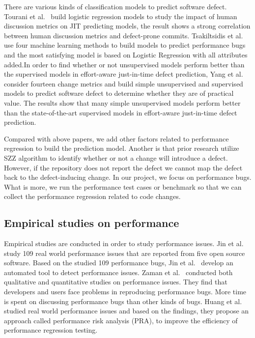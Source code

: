 There are various kinds of classification models to predict software defect. Tourani et al.~\cite{tourani2016impact} build logistic regression models to study the impact of human discussion metrics on JIT predicting models, the result shows a strong correlation between human discussion metrics and defect-prone commits.  Tsakiltsidis et al.~\cite{tsakiltsidis2016automatic} use four machine learning methods to build models to predict performance bugs and the most satisfying model is based on Logistic Regression with all attributes added.In order to find whether or not unsupervised models perform better than the supervised models in effort-aware just-in-time defect prediction, Yang et al.~\cite{Yang:2016:EJD} consider fourteen change metrics and build simple unsupervised and supervised models to predict software defect to determine whether they are of practical value. The results show that many simple unsupervised models perform better than the state-of-the-art supervised models in effort-aware just-in-time defect prediction. 

 Compared with above papers, we add other factors related to performance regression to build the prediction model. Another is that prior research utilize SZZ algorithm to identify whether or not a change will introduce a defect. However, if the repository does not report the defect we cannot map the defect back to the defect-inducing change. In our project, we focus on performance bugs. What is more, we run the performance test cases or benchmark so that we can collect the performance regression related to code changes.

\subsection{Empirical studies on performance}
Empirical studies are conducted in order to study performance issues. Jin et al.~\cite{Jin:2012} study 109 real world performance issues that are reported from five open source software. Based on the studied 109 performance bugs, Jin et al.~\cite{Jin:2012} develop an automated tool to detect performance issues. Zaman et al.~\cite{MSR11:Zaman,MSR12:Zaman} conducted both qualitative and quantitative studies on performance issues. They find that developers and users face problems in reproducing performance bugs. More time is spent on discussing performance bugs than other kinds of bugs. Huang et al.~\cite{ICSE2014:Huang} studied real world performance issues and based on the findings, they propose an approach called performance risk analysis (PRA), to improve the efficiency of performance regression testing. 

